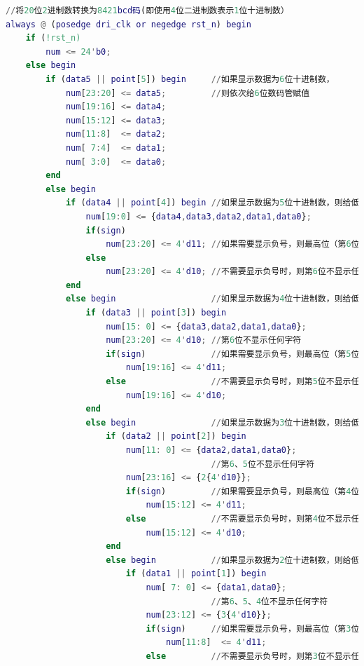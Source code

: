 \documentclass[UTF8]{article}
\theoremstyle{MyLineTheoremStyle} %
\theoremstyle{MyBlockTheoremStyle} %
\theoremstyle{MySubsubsectionStyle} %
\begin{document}
\begin{lstlisting}[language=Matlab, style=MatlabStyle_src]
//将20位2进制数转换为8421bcd码(即使用4位二进制数表示1位十进制数）
always @ (posedge dri_clk or negedge rst_n) begin
    if (!rst_n)
        num <= 24'b0;
    else begin
        if (data5 || point[5]) begin     //如果显示数据为6位十进制数，
            num[23:20] <= data5;         //则依次给6位数码管赋值
            num[19:16] <= data4;
            num[15:12] <= data3;
            num[11:8]  <= data2;
            num[ 7:4]  <= data1;
            num[ 3:0]  <= data0;
        end
        else begin                         
            if (data4 || point[4]) begin //如果显示数据为5位十进制数，则给低5位数码管赋值
                num[19:0] <= {data4,data3,data2,data1,data0};
                if(sign)                    
                    num[23:20] <= 4'd11; //如果需要显示负号，则最高位（第6位）为符号位
                else
                    num[23:20] <= 4'd10; //不需要显示负号时，则第6位不显示任何字符
            end
            else begin                   //如果显示数据为4位十进制数，则给低4位数码管赋值
                if (data3 || point[3]) begin
                    num[15: 0] <= {data3,data2,data1,data0};
                    num[23:20] <= 4'd10; //第6位不显示任何字符
                    if(sign)             //如果需要显示负号，则最高位（第5位）为符号位
                        num[19:16] <= 4'd11;
                    else                 //不需要显示负号时，则第5位不显示任何字符
                        num[19:16] <= 4'd10;
                end
                else begin               //如果显示数据为3位十进制数，则给低3位数码管赋值
                    if (data2 || point[2]) begin
                        num[11: 0] <= {data2,data1,data0};
                                         //第6、5位不显示任何字符
                        num[23:16] <= {2{4'd10}};
                        if(sign)         //如果需要显示负号，则最高位（第4位）为符号位
                            num[15:12] <= 4'd11;
                        else             //不需要显示负号时，则第4位不显示任何字符
                            num[15:12] <= 4'd10;
                    end
                    else begin           //如果显示数据为2位十进制数，则给低2位数码管赋值
                        if (data1 || point[1]) begin
                            num[ 7: 0] <= {data1,data0};
                                         //第6、5、4位不显示任何字符
                            num[23:12] <= {3{4'd10}};
                            if(sign)     //如果需要显示负号，则最高位（第3位）为符号位
                                num[11:8]  <= 4'd11;
                            else         //不需要显示负号时，则第3位不显示任何字符

\end{lstlisting}
\end{document}
